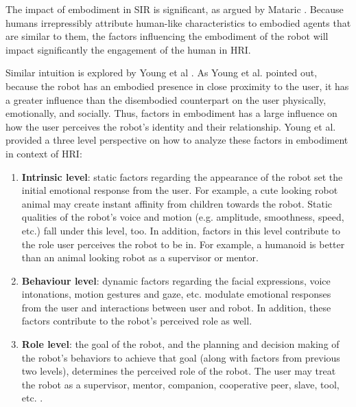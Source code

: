 \documentclass{ut-thesis}
\begin{document}
The impact of embodiment in SIR is significant, as argued by Mataric \cite{mataric2005role}.  Because humans irrepressibly attribute human-like characteristics to embodied agents that are similar to them, the factors influencing the embodiment of the robot will impact significantly the engagement of the human in HRI.


Similar intuition is explored by Young et al \cite{young2011evaluating}.  As Young et al. pointed out, because the robot has an embodied presence in close proximity to the user, it has a greater influence than the disembodied counterpart on the user physically, emotionally, and socially. Thus, factors in embodiment has a large influence on how the user perceives the robot's identity and their relationship.  Young et al. provided a three level perspective on how to analyze these factors in embodiment in context of HRI:
\begin{enumerate}
	\item \textbf{Intrinsic level}: static factors regarding the appearance of the robot set the initial emotional response from the user.  For example, a cute looking robot animal may create instant affinity from children towards the robot.  Static qualities of the robot's voice and motion (e.g. amplitude, smoothness, speed, etc.) fall under this level, too.  In addition, factors in this level contribute to the role user perceives the robot to be in.  For example, a humanoid is better than an animal looking robot as a supervisor or mentor.

	\item \textbf{Behaviour level}: dynamic factors regarding the facial expressions, voice intonations, motion gestures and gaze, etc. modulate emotional responses from the user and interactions between user and robot.  In addition, these factors contribute to the robot's perceived role as well.

	\item \textbf{Role level}: the goal of the robot, and the planning and decision making of the robot's behaviors to achieve that goal (along with factors from previous two levels), determines the perceived role of the robot.  The user may treat the robot as a supervisor, mentor, companion, cooperative peer, slave, tool, etc. \cite{goodrich2007human}.
\end{enumerate}
\end{document}
